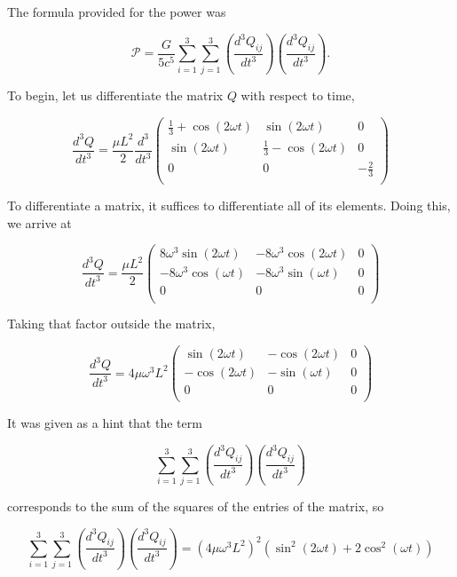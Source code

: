 \documentclass[11pt]{article}
\begin{document}
\begin{pproblem}
\begin{pssolution*}{}{}
\begin{alternativas}
        \item The formula provided for the power was
        
        \[
        \mathcal{P} = \frac{G}{5c^5} \sum_{i=1}^3 \sum_{j=1}^3 \left( \frac{d^3 Q_{ij}}{dt^3} \right) \left( \frac{d^3 Q_{ij}}{dt^3} \right).
        \]

        To begin, let us differentiate the matrix \(Q\) with respect to time,

        \[\frac{d^3 Q}{dt^3} = \frac{\mu L^2}{2}\frac{d^3}{dt^3}\left(\begin{matrix}
            \frac{1}{3}+\cos(2\omega t) & \sin(2\omega t) & 0 \\
            \sin(2\omega t) & \frac{1}{3} - \cos(2\omega t) & 0 \\
            0 & 0 & -\frac{2}{3} \\
        \end{matrix}\right)\]

        To differentiate a matrix, it suffices to differentiate all of its elements. Doing this, we arrive at

        \[\frac{d^3Q}{dt^3} = \frac{\mu L^2}{2}\left(\begin{matrix}
            8\omega^3 \sin(2\omega t) & -8\omega ^3\cos(2\omega t) & 0 \\
            -8\omega^3\cos(\omega t) & -8\omega^3\sin(\omega t) & 0 \\
            0 & 0 & 0 \\ 
        \end{matrix}\right)\]

        Taking that factor outside the matrix,

        \[\frac{d^3Q}{dt^3} = 4\mu\omega^3L^2\left(\begin{matrix}
            \sin(2\omega t) & - \cos(2\omega t) & 0 \\
            -\cos(2\omega t) & - \sin(\omega t) & 0 \\
            0 & 0 & 0 \\
        \end{matrix}\right)\]

        It was given as a hint that the term

        \[\sum_{i=1}^3 \sum_{j=1}^3 \left( \frac{d^3 Q_{ij}}{dt^3} \right) \left( \frac{d^3 Q_{ij}}{dt^3} \right)\]

        corresponds to the sum of the squares of the entries of the matrix, so

        \[\sum_{i=1}^3 \sum_{j=1}^3 \left( \frac{d^3 Q_{ij}}{dt^3} \right) \left( \frac{d^3 Q_{ij}}{dt^3} \right) = (4\mu \omega^3 L^2)^2(\sin^2(2\omega t) + 2 \cos^2(\omega t))\]


\end{alternativas}
\end{pssolution*}
\end{pproblem}
\end{document}
